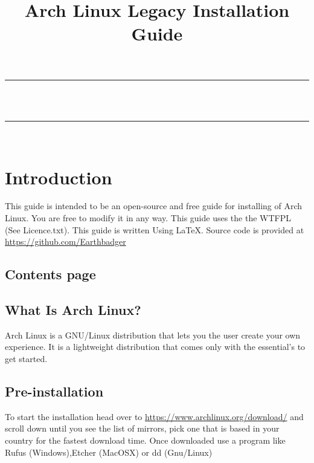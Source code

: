 \documentclass[titlepage]{article}
\title{Arch Linux Legacy Installation Guide} %
\makeatletter
\let\thetitle\@title
\makeatother
\begin{document}

\begin{titlepage}
    \centering
    \vspace*{0.5 cm}
	\rule{\linewidth}{0.2 mm} \\[0.5 cm]
	{ \huge \bfseries \thetitle}\\
	\rule{\linewidth}{0.2 mm} \\[1.5 cm]
	  
\end{titlepage}

\section*{Introduction}
This guide is intended to be an open-source and free guide for installing of Arch Linux. You are free to modify it in any way.
This guide uses the the WTFPL (See Licence.txt). This guide is written Using {\LaTeX}. Source code is provided at \url{https://github.com/Earthbadger}

\newpage
\begin{centering}
\section*{Contents page}
\end{centering}
\tableofcontents
\newpage
\begin{centering}
\section{What Is Arch Linux?}
     \end{centering}
     Arch Linux is a GNU/Linux distribution that lets you the user create your own experience. It is a lightweight distribution that comes only with the essential's to get started.
\newpage
\begin{centering}
\section{Pre-installation}
\end{centering}
   To start the installation head over to \url{https://www.archlinux.org/download/} and scroll down until you see the list of mirrors, pick one that is based in your country for the fastest download time. Once downloaded use a program like Rufus (Windows),Etcher (MacOSX) or dd (Gnu/Linux)\\
    \vspace*{0.5 cm}
\end{document}
